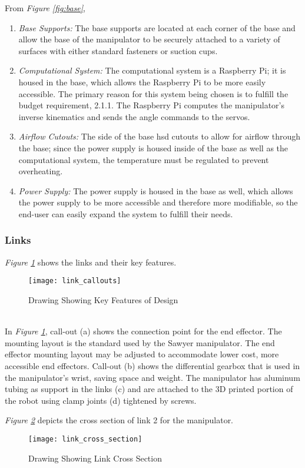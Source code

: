 From \emph{Figure \ref{fig:base}},
\begin{enumerate}[label=\alph*.]
  \item \emph{Base Supports:}
  The base supports are located at each corner of the base and allow the base of the manipulator to be securely attached to a variety of surfaces with either standard fasteners or suction cups.
  \item \emph{Computational System:}
  The computational system is a Raspberry Pi; it is housed in the base, which allows the Raspberry Pi to be more easily accessible. The primary reason for this system being chosen is to fulfill the budget requirement, 2.1.1. The Raspberry Pi computes the manipulator's inverse kinematics and sends the angle commands to the servos.
  \item \emph{Airflow Cutouts:}
  The side of the base hsd cutouts to allow for airflow through the base; since the power supply is housed inside of the base as well as the computational system, the temperature must be regulated to prevent overheating.
  \item \emph{Power Supply:}
  The power supply is housed in the base as well, which allows the power supply to be more accessible and therefore more modifiable, so the end-user can easily expand the system to fulfill their needs.
\end{enumerate}
\newpage
\subsubsection{Links}
\emph{Figure \ref{fig:link1}} shows the links and their key features.\\
\begin{figure}[htp]
  \centering
  \texttt{[image: link\_callouts]}
  \caption{Drawing Showing Key Features of Design}
  \label{fig:link1}
\end{figure} \\
In \emph{Figure \ref{fig:link1}}, call-out (a) shows the connection point for the end effector. The mounting layout is the standard used by the Sawyer manipulator. The end effector mounting layout may be adjusted to accommodate lower cost, more accessible end effectors. Call-out (b) shows the differential gearbox that is used in the manipulator’s wrist, saving space and weight. The manipulator has aluminum tubing as support in the links (c) and are attached to the 3D printed portion of the robot using clamp joints (d) tightened by screws.

\emph{Figure \ref{fig:link2}} depicts the cross section of link 2 for the manipulator.
\begin{figure}[htp]
  \centering
  \texttt{[image: link\_cross\_section]}
  \caption{Drawing Showing Link Cross Section}
  \label{fig:link2}
\end{figure}

